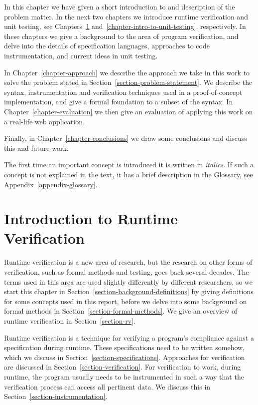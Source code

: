 \documentclass[a4paper,11pt]{kth-mag}
\theoremstyle{definition}
\begin{document}
In this chapter we have given a short introduction to and description of the
problem matter. In the next two chapters we introduce runtime verification and
unit testing, see Chapters~\ref{chapter-intro-to-rv}
and~\ref{chapter-intro-to-unit-testing}, respectively. In these chapters we
give a background to the area of program verification, and delve into the
details of specification languages, approaches to code instrumentation, and
current ideas in unit testing.

In Chapter~\ref{chapter-approach} we describe the approach we take in this work to
solve the problem stated in Section~\ref{section-problem-statement}. We
describe the syntax, instrumentation and verification techniques used in a
proof-of-concept implementation, and give a formal foundation to a subset of
the syntax. In Chapter~\ref{chapter-evaluation} we then give an evaluation of
applying this work on a real-life web application.

Finally, in Chapter~\ref{chapter-conclusions} we draw some conclusions and
discuss this and future work.

The first time an important concept is introduced it is written in
\textit{italics}. If such a concept is not explained in the text, it has a
brief description in the Glossary, see Appendix~\ref{appendix-glossary}.







\pagestyle{newchap}
\chapter{Introduction to Runtime Verification} \label{chapter-intro-to-rv}

Runtime verification is a new area of research, but the research on other forms
of verification, such as formal methods and testing, goes back several decades.
The terms used in this area are used slightly differently by different
researchers, so we start this chapter in
Section~\ref{section-background-definitions} by giving definitions for some
concepts used in this report, before we delve into some background on formal
methods in Section~\ref{section-formal-methods}. We give an overview of runtime
verification in Section~\ref{section-rv}.

Runtime verification is a technique for verifying a program's compliance
against a specification during runtime. These specifications need to be written
somehow, which we discuss in Section~\ref{section-specifications}. Approaches
for verification are discussed in Section~\ref{section-verification}. For
verification to work, during runtime, the program usually needs to be
instrumented in such a way that the verification process can access all
pertinent data. We discuss this in Section~\ref{section-instrumentation}.
\end{document}

